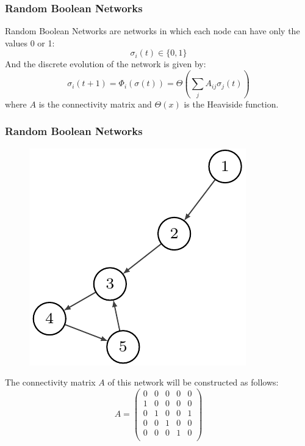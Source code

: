 \documentclass{beamer}
\begin{document}
\begin{frame}


\frametitle{Random Boolean Networks}
Random Boolean Networks are networks in which each node can have only the values 0 or 1:
$$
\sigma_i(t) \in \{0,1\}
$$
And the discrete evolution of the network is given by:
$$
\sigma_i(t+1)=\Phi_i(\sigma(t))=\Theta\left (\sum_j A_{ij}\sigma_j(t)\right )
$$
where $A$ is the connectivity matrix and $\Theta(x)$ is the Heaviside function.
\end{frame}

\begin{frame}
\frametitle{Random Boolean Networks}
\begin{figure}[h]
\centering
\includegraphics[scale=0.5]{images/singlecluster.pdf}
\end{figure}
The connectivity matrix $A$ of this network will be constructed as follows:
$$
A = \left (
\begin{array}{ccccc}

0 & 0 & 0 & 0 & 0  \\
1 & 0 & 0 & 0 & 0  \\
0 & 1 & 0 & 0 & 1  \\
0 & 0 & 1 & 0 & 0  \\
0 & 0 & 0 & 1 & 0  \\

\end{array}
\right )
$$
\end{frame}
\end{document}
